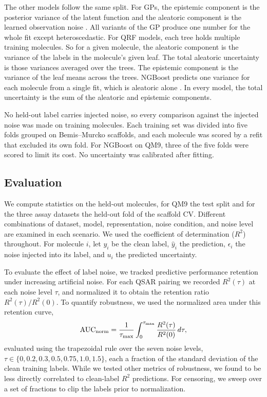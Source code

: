 The other models follow the same split. For GPs, the epistemic component is the posterior variance of the latent function and the aleatoric component is the learned observation noise \citep{Rasmussen2005}. All variants of the GP produce one number for the whole fit except heteroscedastic. For QRF models, each tree holds multiple training molecules. So for a given molecule, the aleatoric component is the variance of the labels in the molecule's given leaf. The total aleatoric uncertainty is those variances averaged over the trees. The epistemic component is the variance of the leaf means across the trees. NGBoost predicts one variance for each molecule from a single fit, which is aleatoric alone \citep{Duan2020}. In every model, the total uncertainty is the sum of the aleatoric and epistemic components.

No held-out label carries injected noise, so every comparison against the injected noise was made on
training molecules. Each training set was divided into five folds grouped on Bemis--Murcko scaffolds, and each
molecule was scored by a refit that excluded its own fold. For NGBoost on QM9, three of the five folds
were scored to limit its cost. No uncertainty was calibrated after fitting.

\subsection{Evaluation}
We compute statistics on the held-out molecules, for QM9 the test split and for the three assay datasets the held-out fold of the scaffold CV. Different combinations of dataset, model, representation, noise condition, and noise level are examined in each scenario. We used the coefficient of determination ($R^2$) throughout. For molecule $i$, let $y_i$ be the clean label, $\hat{y}_i$ the prediction, $\epsilon_i$ the noise injected into its label, and $u_i$ the predicted uncertainty.

To evaluate the effect of label noise, we tracked predictive performance retention under increasing artificial noise. For each QSAR pairing we recorded $R^2(\tau)$ at each noise level $\tau$, and normalized it to obtain the retention ratio $R^2(\tau)/R^2(0)$. To quantify robustness, we used the normalized area under this retention curve,
\begin{equation}
\mathrm{AUC}_{\mathrm{norm}} = \frac{1}{\tau_{\max}} \int_0^{\tau_{\max}} \frac{R^2(\tau)}{R^2(0)}\, d\tau,
\label{eq:aucnorm}
\end{equation}
evaluated using the trapezoidal rule over the seven noise levels, $\tau \in \{0,\allowbreak 0.2,\allowbreak 0.3,\allowbreak 0.5,\allowbreak 0.75,\allowbreak 1.0,\allowbreak 1.5\}$, each a fraction of the standard deviation of the clean training labels. While we tested other metrics of robustness, we found \aucnorm{} to be less directly correlated to clean-label $R^2$ predictions. For censoring, we sweep over a set of fractions to clip the labels prior to normalization. 

